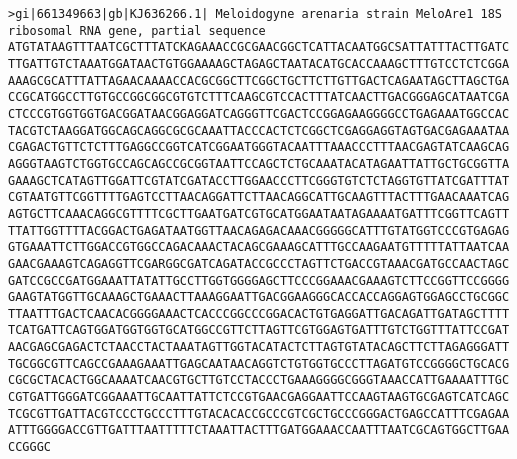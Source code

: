 \documentclass[11pt]{article}
\begin{document}
\begin{Verbatim}[commandchars=\\\{\}]
>gi|661349663|gb|KJ636266.1| Meloidogyne arenaria strain MeloAre1 18S ribosomal RNA gene, partial sequence
ATGTATAAGTTTAATCGCTTTATCKAGAAACCGCGAACGGCTCATTACAATGGCSATTATTTACTTGATC
TTGATTGTCTAAATGGATAACTGTGGAAAAGCTAGAGCTAATACATGCACCAAAGCTTTGTCCTCTCGGA
AAAGCGCATTTATTAGAACAAAACCACGCGGCTTCGGCTGCTTCTTGTTGACTCAGAATAGCTTAGCTGA
CCGCATGGCCTTGTGCCGGCGGCGTGTCTTTCAAGCGTCCACTTTATCAACTTGACGGGAGCATAATCGA
CTCCCGTGGTGGTGACGGATAACGGAGGATCAGGGTTCGACTCCGGAGAAGGGGCCTGAGAAATGGCCAC
TACGTCTAAGGATGGCAGCAGGCGCGCAAATTACCCACTCTCGGCTCGAGGAGGTAGTGACGAGAAATAA
CGAGACTGTTCTCTTTGAGGCCGGTCATCGGAATGGGTACAATTTAAACCCTTTAACGAGTATCAAGCAG
AGGGTAAGTCTGGTGCCAGCAGCCGCGGTAATTCCAGCTCTGCAAATACATAGAATTATTGCTGCGGTTA
GAAAGCTCATAGTTGGATTCGTATCGATACCTTGGAACCCTTCGGGTGTCTCTAGGTGTTATCGATTTAT
CGTAATGTTCGGTTTTGAGTCCTTAACAGGATTCTTAACAGGCATTGCAAGTTTACTTTGAACAAATCAG
AGTGCTTCAAACAGGCGTTTTCGCTTGAATGATCGTGCATGGAATAATAGAAAATGATTTCGGTTCAGTT
TTATTGGTTTTACGGACTGAGATAATGGTTAACAGAGACAAACGGGGGCATTTGTATGGTCCCGTGAGAG
GTGAAATTCTTGGACCGTGGCCAGACAAACTACAGCGAAAGCATTTGCCAAGAATGTTTTTATTAATCAA
GAACGAAAGTCAGAGGTTCGARGGCGATCAGATACCGCCCTAGTTCTGACCGTAAACGATGCCAACTAGC
GATCCGCCGATGGAAATTATATTGCCTTGGTGGGGAGCTTCCCGGAAACGAAAGTCTTCCGGTTCCGGGG
GAAGTATGGTTGCAAAGCTGAAACTTAAAGGAATTGACGGAAGGGCACCACCAGGAGTGGAGCCTGCGGC
TTAATTTGACTCAACACGGGGAAACTCACCCGGCCCGGACACTGTGAGGATTGACAGATTGATAGCTTTT
TCATGATTCAGTGGATGGTGGTGCATGGCCGTTCTTAGTTCGTGGAGTGATTTGTCTGGTTTATTCCGAT
AACGAGCGAGACTCTAACCTACTAAATAGTTGGTACATACTCTTAGTGTATACAGCTTCTTAGAGGGATT
TGCGGCGTTCAGCCGAAAGAAATTGAGCAATAACAGGTCTGTGGTGCCCTTAGATGTCCGGGGCTGCACG
CGCGCTACACTGGCAAAATCAACGTGCTTGTCCTACCCTGAAAGGGGCGGGTAAACCATTGAAAATTTGC
CGTGATTGGGATCGGAAATTGCAATTATTCTCCGTGAACGAGGAATTCCAAGTAAGTGCGAGTCATCAGC
TCGCGTTGATTACGTCCCTGCCCTTTGTACACACCGCCCGTCGCTGCCCGGGACTGAGCCATTTCGAGAA
ATTTGGGGACCGTTGATTTAATTTTTCTAAATTACTTTGATGGAAACCAATTTAATCGCAGTGGCTTGAA
CCGGGC


\end{Verbatim}
\end{document}

